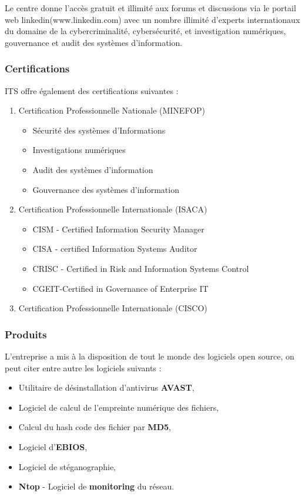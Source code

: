          Le centre donne l'accès gratuit et illimité aux forums et discussions via le portail web linkedin(www.linkedin.com) avec un nombre illimité d'experts internationaux du domaine de la cybercriminalité, cybersécurité, et investigation numériques, gouvernance et audit des systèmes d'information.
         
        		\subsubsection{Certifications}
        		
        		ITS offre également des certifications suivantes :
        			\begin{enumerate}
        				\item Certification Professionnelle Nationale (MINEFOP)
        					\begin{itemize}
        						\item Sécurité des systèmes d’Informations
								\item Investigations numériques
								\item Audit des systèmes d’information
								\item Gouvernance des systèmes d’information
        					\end{itemize}
                		\item Certification Professionnelle Internationale (ISACA)
                			\begin{itemize}
                				\item CISM - Certified Information Security Manager
								\item CISA - certified Information Systems Auditor
								\item CRISC - Certified in Risk and Information Systems Control
								\item CGEIT-Certified in Governance of Enterprise IT
                			\end{itemize}
                		\item Certification Professionnelle Internationale (CISCO)
        			\end{enumerate}
				
				\subsubsection{Produits}
					L'entreprise a mis à la disposition de tout le monde des logiciels open source, on peut citer entre autre les logiciels suivants :
					\begin{itemize}
						\item Utilitaire de désinstallation d'antivirus \textbf{AVAST},
						\item Logiciel de calcul de l'empreinte numérique des fichiers,
						\item Calcul du hash code des fichier par \textbf{MD5},
						\item Logiciel d'\textbf{EBIOS},
						\item Logiciel de stéganographie,
						\item \textbf{Ntop} - Logiciel de \textbf{monitoring} du réseau.
					\end{itemize}
					
